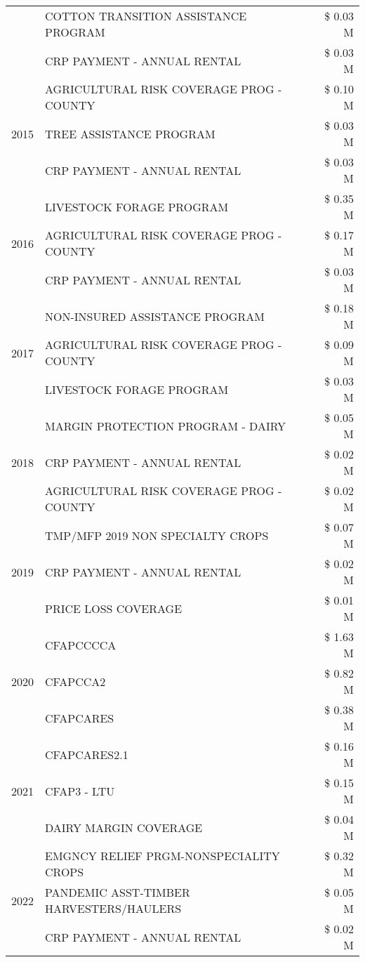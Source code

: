 \begin{tabular}{llr}
 & COTTON TRANSITION ASSISTANCE PROGRAM & \$ 0.03 M \\
 & CRP PAYMENT - ANNUAL RENTAL & \$ 0.03 M \\
\cline{1-3}
\multirow[t]{3}{*}{2015} & AGRICULTURAL RISK COVERAGE PROG - COUNTY & \$ 0.10 M \\
 & TREE ASSISTANCE PROGRAM & \$ 0.03 M \\
 & CRP PAYMENT - ANNUAL RENTAL & \$ 0.03 M \\
\cline{1-3}
\multirow[t]{3}{*}{2016} & LIVESTOCK FORAGE PROGRAM & \$ 0.35 M \\
 & AGRICULTURAL RISK COVERAGE PROG - COUNTY & \$ 0.17 M \\
 & CRP PAYMENT - ANNUAL RENTAL & \$ 0.03 M \\
\cline{1-3}
\multirow[t]{3}{*}{2017} & NON-INSURED ASSISTANCE PROGRAM & \$ 0.18 M \\
 & AGRICULTURAL RISK COVERAGE PROG - COUNTY & \$ 0.09 M \\
 & LIVESTOCK FORAGE PROGRAM & \$ 0.03 M \\
\cline{1-3}
\multirow[t]{3}{*}{2018} & MARGIN PROTECTION PROGRAM - DAIRY & \$ 0.05 M \\
 & CRP PAYMENT - ANNUAL RENTAL & \$ 0.02 M \\
 & AGRICULTURAL RISK COVERAGE PROG - COUNTY & \$ 0.02 M \\
\cline{1-3}
\multirow[t]{3}{*}{2019} & TMP/MFP 2019 NON SPECIALTY CROPS & \$ 0.07 M \\
 & CRP PAYMENT - ANNUAL RENTAL & \$ 0.02 M \\
 & PRICE LOSS COVERAGE & \$ 0.01 M \\
\cline{1-3}
\multirow[t]{3}{*}{2020} & CFAPCCCCA & \$ 1.63 M \\
 & CFAPCCA2 & \$ 0.82 M \\
 & CFAPCARES & \$ 0.38 M \\
\cline{1-3}
\multirow[t]{3}{*}{2021} & CFAPCARES2.1 & \$ 0.16 M \\
 & CFAP3 - LTU & \$ 0.15 M \\
 & DAIRY MARGIN COVERAGE & \$ 0.04 M \\
\cline{1-3}
\multirow[t]{3}{*}{2022} & EMGNCY RELIEF PRGM-NONSPECIALITY CROPS & \$ 0.32 M \\
 & PANDEMIC ASST-TIMBER HARVESTERS/HAULERS & \$ 0.05 M \\
 & CRP PAYMENT - ANNUAL RENTAL & \$ 0.02 M \\
\cline{1-3}
\bottomrule
\end{tabular}
